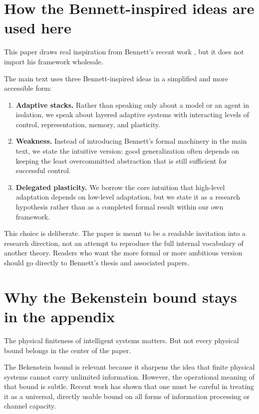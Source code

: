 \documentclass[11pt]{article}
\begin{document}
\appendix

\section{How the Bennett-inspired ideas are used here}


This paper draws real inspiration from Bennett's recent work \citep{bennett2025,bennett2023}, but it does not import his framework wholesale.

The main text uses three Bennett-inspired ideas in a simplified and more accessible form:

\begin{enumerate}
\item \textbf{Adaptive stacks.}
Rather than speaking only about a model or an agent in isolation, we speak about layered adaptive systems with interacting levels of control, representation, memory, and plasticity.

\item \textbf{Weakness.}
Instead of introducing Bennett's formal machinery in the main text, we state the intuitive version: good generalization often depends on keeping the least overcommitted abstraction that is still sufficient for successful control.

\item \textbf{Delegated plasticity.}
We borrow the core intuition that high-level adaptation depends on low-level adaptation, but we state it as a research hypothesis rather than as a completed formal result within our own framework.

\end{enumerate}

This choice is deliberate. The paper is meant to be a readable invitation into a research direction, not an attempt to reproduce the full internal vocabulary of another theory. Readers who want the more formal or more ambitious version should go directly to Bennett's thesis and associated papers.

\section{Why the Bekenstein bound stays in the appendix}


The physical finiteness of intelligent systems matters. But not every physical bound belongs in the center of the paper.

The Bekenstein bound is relevant because it sharpens the idea that finite physical systems cannot carry unlimited information. However, the operational meaning of that bound is subtle. Recent work has shown that one must be careful in treating it as a universal, directly usable bound on all forms of information processing or channel capacity.
\end{document}
